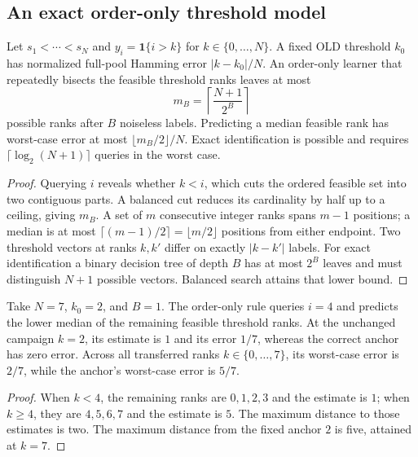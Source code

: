 \subsection{An exact order-only threshold model}

\begin{theorem}
Let $s_1<\cdots<s_N$ and $y_i=\mathbf{1}\{i>k\}$ for
$k\in\{0,\ldots,N\}$.  A fixed OLD threshold $k_0$ has normalized
full-pool Hamming error $|k-k_0|/N$.  An order-only learner that repeatedly
bisects the feasible threshold ranks leaves at most
\[
 m_B=\left\lceil\frac{N+1}{2^B}\right\rceil
\]
possible ranks after $B$ noiseless labels.  Predicting a median feasible
rank has worst-case error at most $\lfloor m_B/2\rfloor/N$.  Exact
identification is possible and requires
$\lceil\log_2(N+1)\rceil$ queries in the worst case.
\end{theorem}
\begin{proof}
Querying $i$ reveals whether $k<i$, which cuts the ordered feasible set
into two contiguous parts.  A balanced cut reduces its cardinality by
half up to a ceiling, giving $m_B$.  A set of $m$ consecutive integer
ranks spans $m-1$ positions; a median is at most
$\lceil(m-1)/2\rceil=\lfloor m/2\rfloor$ positions from either endpoint.
Two threshold vectors at ranks $k,k'$ differ on exactly $|k-k'|$ labels.
For exact identification a binary decision tree of depth $B$ has at most
$2^B$ leaves and must distinguish $N+1$ possible vectors.  Balanced search
attains that lower bound.
\end{proof}

\begin{counterexample}
Take $N=7$, $k_0=2$, and $B=1$.  The order-only rule queries $i=4$ and
predicts the lower median of the remaining feasible threshold ranks.
At the unchanged campaign $k=2$, its estimate is $1$ and its error $1/7$,
whereas the correct anchor has zero error.  Across all transferred ranks
$k\in\{0,\ldots,7\}$, its worst-case error is $2/7$, while the anchor's
worst-case error is $5/7$.
\end{counterexample}
\begin{proof}
When $k<4$, the remaining ranks are $0,1,2,3$ and the estimate is $1$;
when $k\geq4$, they are $4,5,6,7$ and the estimate is $5$.  The maximum
distance to those estimates is two.  The maximum distance from the fixed
anchor $2$ is five, attained at $k=7$.
\end{proof}

